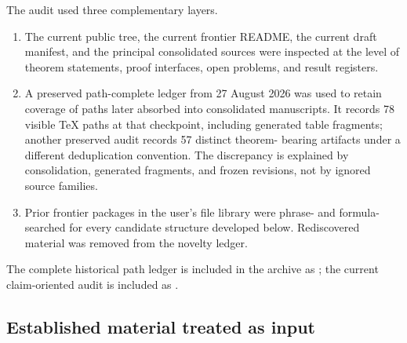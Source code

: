 \documentclass[11pt]{article}
\numberwithin{equation}{section}
\theoremstyle{definition}
\theoremstyle{remark}
\begin{document}
The audit used three complementary layers.
\begin{enumerate}[label=\textbf{A\arabic*.},leftmargin=*]
\item The current public tree, the current frontier README, the current draft
      manifest, and the principal consolidated sources were inspected at the
      level of theorem statements, proof interfaces, open problems, and result
      registers.
\item A preserved path-complete ledger from 27 August 2026 was used to retain
      coverage of paths later absorbed into consolidated manuscripts.  It
      records 78 visible TeX paths at that checkpoint, including generated
      table fragments; another preserved audit records 57 distinct theorem-
      bearing artifacts under a different deduplication convention.  The
      discrepancy is explained by consolidation, generated fragments, and
      frozen revisions, not by ignored source families.
\item Prior frontier packages in the user's file library were phrase- and
      formula-searched for every candidate structure developed below.
      Rediscovered material was removed from the novelty ledger.
\end{enumerate}
The complete historical path ledger is included in the archive as
; the current claim-oriented audit is
included as .

\subsection{Established material treated as input}
\end{document}
